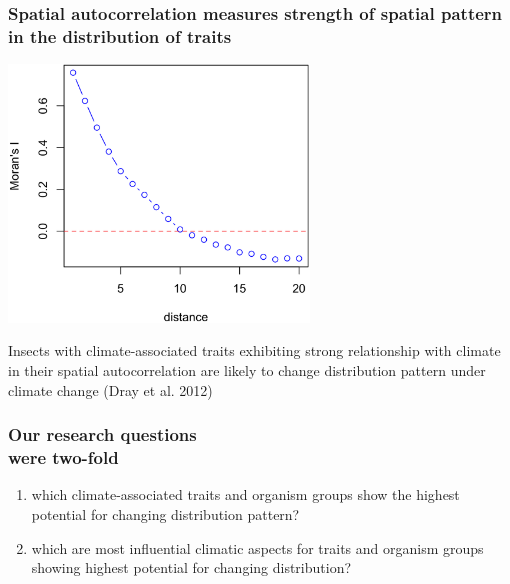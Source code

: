 \documentclass[10pt, compress]{beamer}
\begin{document}
\begin{frame}[fragile]
  \frametitle{Spatial autocorrelation measures strength of spatial pattern \protect\\ in the distribution of traits}
  \centering
  \includegraphics[width=0.6\textwidth]{images/spcorr.png}\\
  \pause
  \raggedright
  Insects with climate-associated traits exhibiting \alert{strong relationship with climate in their spatial autocorrelation} are likely to \alert{change distribution pattern} under climate change \footnotesize{(Dray et al. 2012)}
\end{frame}

\begin{frame}[fragile]
  \frametitle{Our research questions\protect\\ were two-fold}
  \begin{enumerate}
  \item which climate-associated traits and organism groups show the highest potential for changing distribution pattern?
  \medskip
  \pause
  \item which are most influential climatic aspects for traits and organism groups showing highest potential for changing distribution?
  \end{enumerate}
\end{frame}
\end{document}
